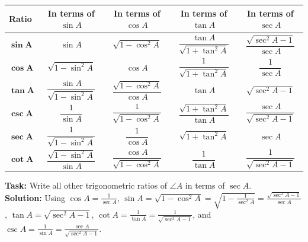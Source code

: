\documentclass[10pt,a4paper]{article}
\begin{document}
\begin{center}
{\small
\begin{tabularx}{\textwidth}{@{}lcccc@{}}
  \toprule
  \textbf{\color{navy}Ratio} & \textbf{\color{navy}In terms of $\sin A$} & \textbf{\color{navy}In terms of $\cos A$} & \textbf{\color{navy}In terms of $\tan A$} & \textbf{\color{navy}In terms of $\sec A$} \\
  \midrule
  $\mathbf{\sin A}$ & $\sin A$ & $\sqrt{1 - \cos^2 A}$ & $\dfrac{\tan A}{\sqrt{1 + \tan^2 A}}$ & $\dfrac{\sqrt{\sec^2 A - 1}}{\sec A}$ \\
  \addlinespace[2.5pt]
  $\mathbf{\cos A}$ & $\sqrt{1 - \sin^2 A}$ & $\cos A$ & $\dfrac{1}{\sqrt{1 + \tan^2 A}}$ & $\dfrac{1}{\sec A}$ \\
  \addlinespace[2.5pt]
  $\mathbf{\tan A}$ & $\dfrac{\sin A}{\sqrt{1 - \sin^2 A}}$ & $\dfrac{\sqrt{1 - \cos^2 A}}{\cos A}$ & $\tan A$ & $\sqrt{\sec^2 A - 1}$ \\
  \addlinespace[2.5pt]
  $\mathbf{\csc A}$ & $\dfrac{1}{\sin A}$ & $\dfrac{1}{\sqrt{1 - \cos^2 A}}$ & $\dfrac{\sqrt{1 + \tan^2 A}}{\tan A}$ & $\dfrac{\sec A}{\sqrt{\sec^2 A - 1}}$ \\
  \addlinespace[2.5pt]
  $\mathbf{\sec A}$ & $\dfrac{1}{\sqrt{1 - \sin^2 A}}$ & $\dfrac{1}{\cos A}$ & $\sqrt{1 + \tan^2 A}$ & $\sec A$ \\
  \addlinespace[2.5pt]
  $\mathbf{\cot A}$ & $\dfrac{\sqrt{1 - \sin^2 A}}{\sin A}$ & $\dfrac{\cos A}{\sqrt{1 - \cos^2 A}}$ & $\dfrac{1}{\tan A}$ & $\dfrac{1}{\sqrt{\sec^2 A - 1}}$ \\
  \bottomrule
\end{tabularx}}
\end{center}

\vspace{0.8mm}
\begin{conceptBox}[title=Worked Model: Expressing Ratios in terms of $\sec A$ (NCERT Standard),fonttitle=\bfseries\color{navy}]
  \textbf{Task:} Write all other trigonometric ratios of $\angle A$ in terms of $\sec A$. \\
  \textbf{Solution:} Using $\cos A = \frac{1}{\sec A}$, $\sin A = \sqrt{1 - \cos^2 A} = \sqrt{1 - \frac{1}{\sec^2 A}} = \frac{\sqrt{\sec^2 A - 1}}{\sec A}$, $\tan A = \sqrt{\sec^2 A - 1}$, $\cot A = \frac{1}{\tan A} = \frac{1}{\sqrt{\sec^2 A - 1}}$, and $\csc A = \frac{1}{\sin A} = \frac{\sec A}{\sqrt{\sec^2 A - 1}}$.
\end{conceptBox}

\newpage

\thispagestyle{fancy}
\vspace*{0mm}
\end{document}
